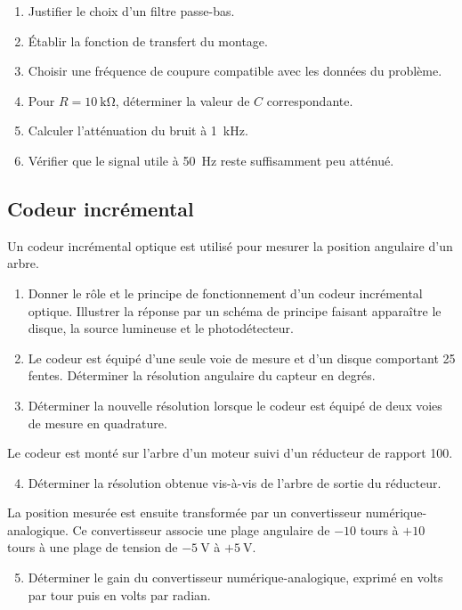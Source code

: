 \begin{enumerate}
  \item Justifier le choix d'un filtre passe-bas.
  \item Établir la fonction de transfert du montage.
  \item Choisir une fréquence de coupure compatible avec les données du problème.
  \item Pour $R=\SI{10}{\kilo\ohm}$, déterminer la valeur de $C$ correspondante.
  \item Calculer l'atténuation du bruit à \SI{1}{\kilo\hertz}.
  \item Vérifier que le signal utile à \SI{50}{\hertz} reste suffisamment peu atténué.
\end{enumerate}

\subsection{Codeur incrémental}

Un codeur incrémental optique est utilisé pour mesurer la position angulaire d'un arbre.

\begin{enumerate}
  \item Donner le rôle et le principe de fonctionnement d'un codeur incrémental optique. Illustrer la réponse par un schéma de principe faisant apparaître le disque, la source lumineuse et le photodétecteur.
  \item Le codeur est équipé d'une seule voie de mesure et d'un disque comportant 25 fentes. Déterminer la résolution angulaire du capteur en degrés.
  \item Déterminer la nouvelle résolution lorsque le codeur est équipé de deux voies de mesure en quadrature.
\end{enumerate}

Le codeur est monté sur l'arbre d'un moteur suivi d'un réducteur de rapport 100.

\begin{enumerate}
  \setcounter{enumi}{3}
  \item Déterminer la résolution obtenue vis-à-vis de l'arbre de sortie du réducteur.
\end{enumerate}

La position mesurée est ensuite transformée par un convertisseur numérique-analogique. Ce convertisseur associe une plage angulaire de $-10$ tours à $+10$ tours à une plage de tension de $-\SI{5}{\volt}$ à $+\SI{5}{\volt}$.

\begin{enumerate}
  \setcounter{enumi}{4}
  \item Déterminer le gain du convertisseur numérique-analogique, exprimé en volts par tour puis en volts par radian.
\end{enumerate}
